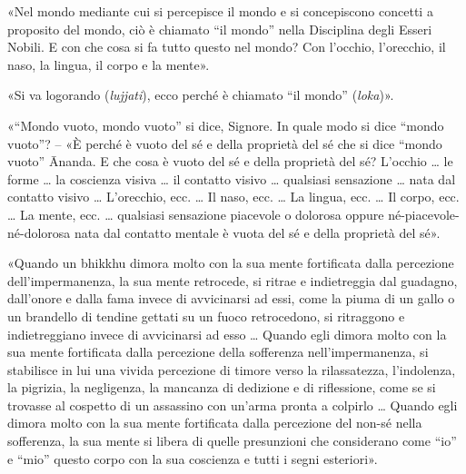 
«Nel mondo mediante cui si percepisce il mondo e si concepiscono concetti a
proposito del mondo, ciò è chiamato “il mondo” nella Disciplina degli Esseri
Nobili. E con che cosa si fa tutto questo nel mondo? Con l’occhio, l’orecchio,
il naso, la lingua, il corpo e la mente».


«Si va logorando (\emph{lujjati}), ecco perché è chiamato “il mondo”
(\emph{loka})».



«“Mondo vuoto, mondo vuoto” si dice, Signore. In quale modo si dice “mondo
vuoto”? – «È perché è vuoto del sé e della proprietà del sé che si dice “mondo
vuoto” Ānanda. E che cosa è vuoto del sé e della proprietà del sé? L’occhio … le
forme … la coscienza visiva … il contatto visivo … qualsiasi sensazione … nata
dal contatto visivo … L’orecchio, ecc. … Il naso, ecc. … La lingua, ecc. … Il
corpo, ecc. … La mente, ecc. … qualsiasi sensazione piacevole o dolorosa oppure
né-piacevole-né-dolorosa nata dal contatto mentale è vuota del sé e della
proprietà del sé».


«Quando un bhikkhu dimora molto con la sua mente fortificata dalla percezione
dell’impermanenza, la sua mente retrocede, si ritrae e indietreggia dal
guadagno, dall’onore e dalla fama invece di avvicinarsi ad essi, come la piuma
di un gallo o un brandello di tendine gettati su un fuoco retrocedono, si
ritraggono e indietreggiano invece di avvicinarsi ad esso … Quando egli dimora
molto con la sua mente fortificata dalla percezione della sofferenza
nell’impermanenza, si stabilisce in lui una vivida percezione di timore verso la
rilassatezza, l’indolenza, la pigrizia, la negligenza, la mancanza di dedizione
e di riflessione, come se si trovasse al cospetto di un assassino con un’arma
pronta a colpirlo … Quando egli dimora molto con la sua mente fortificata dalla
percezione del non-sé nella sofferenza, la sua mente si libera di quelle
presunzioni che considerano come “io” e “mio” questo corpo con la sua coscienza
e tutti i segni esteriori».


